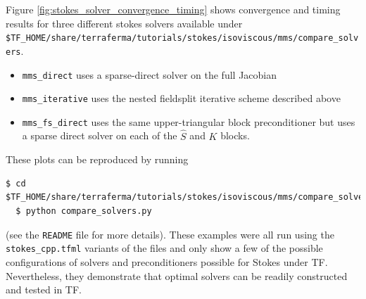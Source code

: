 Figure \ref{fig:stokes_solver_convergence_timing}  shows convergence
and timing results for three different stokes solvers available under
\texttt{\$TF\_HOME/share/terraferma/tutorials/stokes/isoviscous/mms/compare\_solvers}.
\begin{itemize}
\item \texttt{mms\_direct} uses a sparse-direct solver on the full Jacobian
\item \texttt{mms\_iterative} uses the nested fieldsplit iterative
  scheme described above
\item \texttt{mms\_fs\_direct} uses the same upper-triangular block
  preconditioner but uses a sparse direct solver on each of the
  $\hat{S}$ and $K$ blocks.
\end{itemize}
These plots can be reproduced by running
\begin{lstlisting}[style=Bash]
  $ cd $TF_HOME/share/terraferma/tutorials/stokes/isoviscous/mms/compare_solvers
  $ python compare_solvers.py
\end{lstlisting} %
(see the \texttt{README} file for more details).
These examples were all run using the \texttt{stokes\_cpp.tfml}
variants of the files and  only show a few of the possible configurations of
solvers and preconditioners possible for Stokes under
TF. Nevertheless,  they demonstrate that optimal solvers can be
readily constructed and tested in TF.  


